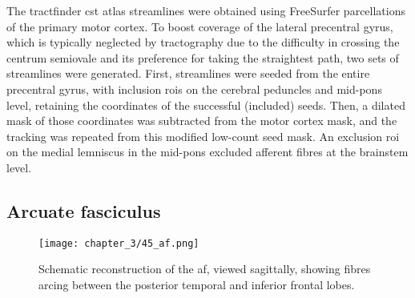 The tractfinder \gls{cst} atlas streamlines were obtained using FreeSurfer parcellations \autocite{Desikan2006,FischlSalat2002} of the primary motor cortex.
To boost coverage of the lateral precentral gyrus, which is typically neglected by tractography due to the difficulty in crossing the centrum semiovale and its preference for taking the straightest path, two sets of streamlines were generated.
First, streamlines were seeded from the entire precentral gyrus, with inclusion \glspl{roi} on the cerebral peduncles and mid-pons level, retaining the coordinates of the successful (included) seeds.
Then, a dilated mask of those coordinates was subtracted from the motor cortex mask, and the tracking was repeated from this modified low-count seed mask.
An exclusion \gls{roi} on the medial lemniscus in the mid-pons excluded afferent fibres at the brainstem level.

\subsection{Arcuate fasciculus}

%

\begin{SCfigure}[][htb!]
  \texttt{[image: chapter\_3/45\_af.png]}
  \caption{Schematic reconstruction of the \gls{af}, viewed sagittally, showing fibres arcing between the posterior temporal and inferior frontal lobes.}
  \label{fig:af}
\end{SCfigure}

